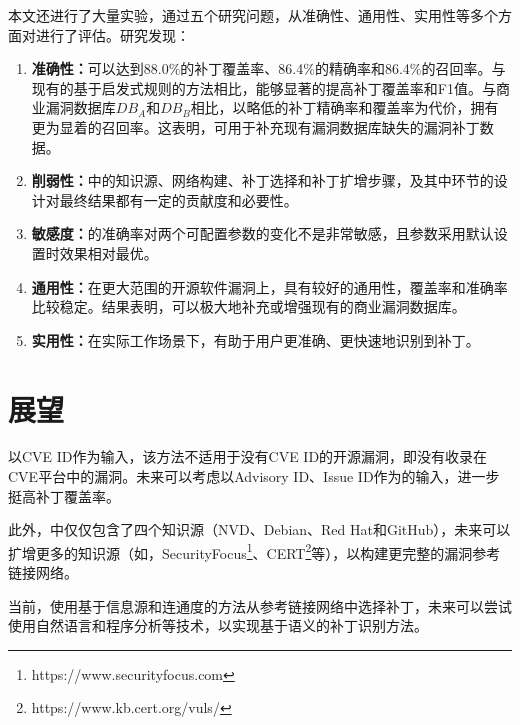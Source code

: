 本文还进行了大量实验，通过五个研究问题，从准确性、通用性、实用性等多个方面对\tool 进行了评估。研究发现：
\begin{enumerate}
    \item [（1）] \textbf{准确性：}\tool 可以达到88.0\%的补丁覆盖率、86.4\%的精确率和86.4\%的召回率。与现有的基于启发式规则的方法相比，\tool 能够显著的提高补丁覆盖率和F1值。与商业漏洞数据库$DB_A$和$DB_B$相比，\tool 以略低的补丁精确率和覆盖率为代价，拥有更为显着的召回率。这表明，\tool 可用于补充现有漏洞数据库缺失的漏洞补丁数据。
    \item [（2）] \textbf{削弱性：}\tool 中的知识源、网络构建、补丁选择和补丁扩增步骤，及其中环节的设计对最终结果都有一定的贡献度和必要性。
    \item [（3）] \textbf{敏感度：}\tool 的准确率对两个可配置参数的变化不是非常敏感，且参数采用默认设置时效果相对最优。
    \item [（4）] \textbf{通用性：}在更大范围的开源软件漏洞上，\tool 具有较好的通用性，覆盖率和准确率比较稳定。结果表明，\tool 可以极大地补充或增强现有的商业漏洞数据库。
    \item [（5）] \textbf{实用性：}在实际工作场景下，\tool 有助于用户更准确、更快速地识别到补丁。
\end{enumerate}


\section{展望}

\tool 以CVE ID作为输入，该方法不适用于没有CVE ID的开源漏洞，即没有收录在CVE平台中的漏洞。未来可以考虑以Advisory ID、Issue ID作为\tool 的输入，进一步挺高补丁覆盖率。

此外，\tool 中仅仅包含了四个知识源（NVD、Debian、Red Hat和GitHub），未来可以扩增更多的知识源（如，SecurityFocus\footnote{https://www.securityfocus.com}、CERT\footnote{https://www.kb.cert.org/vuls/}等），以构建更完整的漏洞参考链接网络。

当前，\tool 使用基于信息源和连通度的方法从参考链接网络中选择补丁，未来可以尝试使用自然语言和程序分析等技术，以实现基于语义的补丁识别方法。